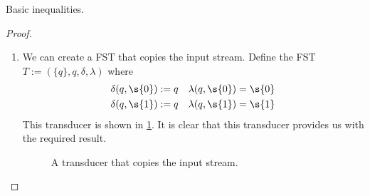\begin{proposition}{Basic inequalities.}
\begin{proof}
\begin{enumerate}
			\item We can create a FST that copies the input stream. Define the FST $T := (\{q\},q,\delta,\lambda)$ where 
			\begin{align*}
				\delta(q,\s{0}) &:= q &\lambda(q,\s{0}) &= \s{0} \\
				\delta(q,\s{1}) &:= q &\lambda(q,\s{1}) &= \s{1}
			\end{align*}
			This transducer is shown in \cref{fig:basic_ineq.trans}. It is clear that this transducer provides us with the required result.
			\begin{figure}[H]
				\centering
				\caption{A transducer that copies the input stream.}
				\label{fig:basic_ineq.trans}
			\end{figure}


\end{enumerate}
\end{proof}
\end{proposition}
